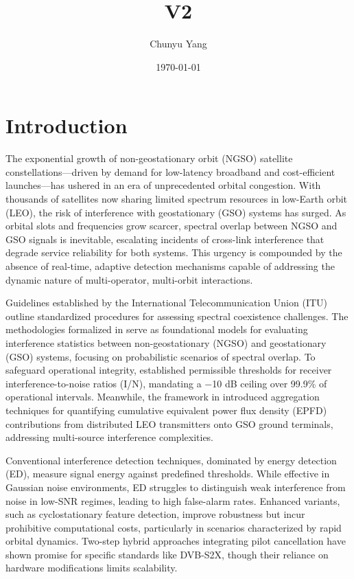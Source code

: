 \documentclass[10pt,twocolumn]{article}
\title{V2}
\author{Chunyu Yang}
\date{\today}
\begin{document}
\maketitle

\section{Introduction}

The exponential growth of non-geostationary orbit (NGSO) satellite constellations—driven by demand for low-latency broadband and cost-efficient launches—has ushered in an era of unprecedented orbital congestion. With thousands of satellites now sharing limited spectrum resources in low-Earth orbit (LEO), the risk of interference with geostationary (GSO) systems has surged. As orbital slots and frequencies grow scarcer, spectral overlap between NGSO and GSO signals is inevitable, escalating incidents of cross-link interference that degrade service reliability for both systems\cite{itu2020}. This urgency is compounded by the absence of real-time, adaptive detection mechanisms capable of addressing the dynamic nature of multi-operator, multi-orbit interactions.

Guidelines established by the International Telecommunication Union (ITU) outline standardized procedures for assessing spectral coexistence challenges. The methodologies formalized in \cite{itur2001SimulationMethodologiesDetermining} serve as foundational models for evaluating interference statistics between non-geostationary (NGSO) and geostationary (GSO) systems, focusing on probabilistic scenarios of spectral overlap. To safeguard operational integrity, \cite{itur2017ProtectionCriteriaOperation} established permissible thresholds for receiver interference-to-noise ratios (I/N), mandating a −10 dB ceiling over 99.9\% of operational intervals. Meanwhile, the framework in \cite{itur2002AggregateDownlinkEquivalent} introduced aggregation techniques for quantifying cumulative equivalent power flux density (EPFD) contributions from distributed LEO transmitters onto GSO ground terminals, addressing multi-source interference complexities.


Conventional interference detection techniques, dominated by energy detection (ED), measure signal energy against predefined thresholds\cite{kay2009fundamentals}. While effective in Gaussian noise environments, ED struggles to distinguish weak interference from noise in low-SNR regimes, leading to high false-alarm rates. Enhanced variants, such as cyclostationary feature detection\cite{experimentalCyclostationary}, improve robustness but incur prohibitive computational costs, particularly in scenarios characterized by rapid orbital dynamics. Two-step hybrid approaches \cite{wangCoFrequencyInterferenceAnalysis2020} integrating pilot cancellation have shown promise for specific standards like DVB-S2X, though their reliance on hardware modifications limits scalability.
\end{document}
